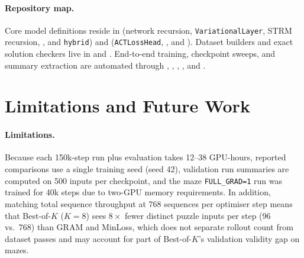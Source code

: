 \documentclass[11pt]{article}
\newcommand{\Bok}{Best-of-$K$}
\begin{document}
\paragraph{Repository map.}
Core model definitions reside in  (network recursion, \texttt{VariationalLayer}, STRM recursion, , and \texttt{hybrid}) and  (\texttt{ACTLossHead}, , and ). Dataset builders and exact solution checkers live in  and . End-to-end training, checkpoint sweeps, and summary extraction are automated through , , , , and .

\section{Limitations and Future Work}
\label{sec:future}

\paragraph{Limitations.}
Because each 150k-step run plus evaluation takes 12--38 GPU-hours, reported comparisons use a single training seed (seed 42), validation run summaries are computed on 500 inputs per checkpoint, and the maze \texttt{FULL\_GRAD=1} run was trained for 40k steps due to two-GPU memory requirements. In addition, matching total sequence throughput at 768 sequences per optimiser step means that \Bok{} ($K=8$) sees $8\times$ fewer distinct puzzle inputs per step (96 vs.\ 768) than GRAM and MinLoss, which does not separate rollout count from dataset passes and may account for part of \Bok{}'s validation validity gap on mazes.
\end{document}
